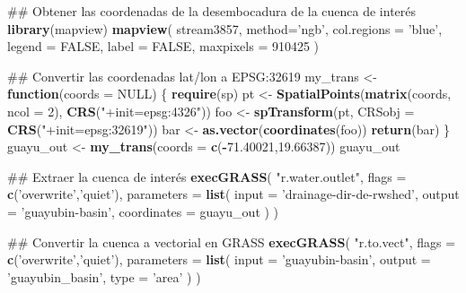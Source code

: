 \documentclass[11pt,]{article}
\newenvironment{Shaded}{\begin{snugshade}}{\end{snugshade}}
\newcommand{\KeywordTok}[1]{\textcolor[rgb]{0.13,0.29,0.53}{\textbf{#1}}}
\newcommand{\DataTypeTok}[1]{\textcolor[rgb]{0.13,0.29,0.53}{#1}}
\newcommand{\DecValTok}[1]{\textcolor[rgb]{0.00,0.00,0.81}{#1}}
\newcommand{\FloatTok}[1]{\textcolor[rgb]{0.00,0.00,0.81}{#1}}
\newcommand{\StringTok}[1]{\textcolor[rgb]{0.31,0.60,0.02}{#1}}
\newcommand{\OtherTok}[1]{\textcolor[rgb]{0.56,0.35,0.01}{#1}}
\newcommand{\ControlFlowTok}[1]{\textcolor[rgb]{0.13,0.29,0.53}{\textbf{#1}}}
\newcommand{\OperatorTok}[1]{\textcolor[rgb]{0.81,0.36,0.00}{\textbf{#1}}}
\newcommand{\NormalTok}[1]{#1}
\begin{document}
\begin{Shaded}
\begin{Highlighting}[]
{{{{{{\NormalTok{## Obtener las coordenadas de la desembocadura de la cuenca de interés}
\KeywordTok{library}\NormalTok{(mapview)}
\KeywordTok{mapview}\NormalTok{(}
\NormalTok{  stream3857, }\DataTypeTok{method=}\StringTok{'ngb'}\NormalTok{, }\DataTypeTok{col.regions =} \StringTok{'blue'}\NormalTok{,}
  \DataTypeTok{legend =} \OtherTok{FALSE}\NormalTok{, }\DataTypeTok{label =} \OtherTok{FALSE}\NormalTok{, }\DataTypeTok{maxpixels =}  \DecValTok{910425}
\NormalTok{)}

\NormalTok{## Convertir las coordenadas lat/lon a EPSG:32619}
\NormalTok{my_trans <-}\StringTok{ }\ControlFlowTok{function}\NormalTok{(}\DataTypeTok{coords =} \OtherTok{NULL}\NormalTok{) \{}
  \KeywordTok{require}\NormalTok{(sp)}
\NormalTok{  pt <-}\StringTok{ }\KeywordTok{SpatialPoints}\NormalTok{(}\KeywordTok{matrix}\NormalTok{(coords, }\DataTypeTok{ncol =} \DecValTok{2}\NormalTok{), }\KeywordTok{CRS}\NormalTok{(}\StringTok{"+init=epsg:4326"}\NormalTok{))}
\NormalTok{  foo <-}\StringTok{ }\KeywordTok{spTransform}\NormalTok{(pt, }\DataTypeTok{CRSobj =} \KeywordTok{CRS}\NormalTok{(}\StringTok{"+init=epsg:32619"}\NormalTok{))}
\NormalTok{  bar <-}\StringTok{ }\KeywordTok{as.vector}\NormalTok{(}\KeywordTok{coordinates}\NormalTok{(foo))}
  \KeywordTok{return}\NormalTok{(bar)}
\NormalTok{\}}
\NormalTok{guayu_out <-}\StringTok{ }\KeywordTok{my_trans}\NormalTok{(}\DataTypeTok{coords =} \KeywordTok{c}\NormalTok{(}\OperatorTok{-}\FloatTok{71.40021}\NormalTok{,}\FloatTok{19.66387}\NormalTok{))}
\NormalTok{guayu_out}

\NormalTok{## Extraer la cuenca de interés}
\KeywordTok{execGRASS}\NormalTok{(}
  \StringTok{"r.water.outlet"}\NormalTok{,}
  \DataTypeTok{flags =} \KeywordTok{c}\NormalTok{(}\StringTok{'overwrite'}\NormalTok{,}\StringTok{'quiet'}\NormalTok{),}
  \DataTypeTok{parameters =} \KeywordTok{list}\NormalTok{(}
    \DataTypeTok{input =} \StringTok{'drainage-dir-de-rwshed'}\NormalTok{,}
    \DataTypeTok{output =} \StringTok{'guayubin-basin'}\NormalTok{,}
    \DataTypeTok{coordinates =}\NormalTok{ guayu_out}
\NormalTok{  )}
\NormalTok{)}

\NormalTok{## Convertir la cuenca a vectorial en GRASS}
\KeywordTok{execGRASS}\NormalTok{(}
  \StringTok{"r.to.vect"}\NormalTok{,}
  \DataTypeTok{flags =} \KeywordTok{c}\NormalTok{(}\StringTok{'overwrite'}\NormalTok{,}\StringTok{'quiet'}\NormalTok{),}
  \DataTypeTok{parameters =} \KeywordTok{list}\NormalTok{(}
    \DataTypeTok{input =} \StringTok{'guayubin-basin'}\NormalTok{,}
    \DataTypeTok{output =} \StringTok{'guayubin_basin'}\NormalTok{,}
    \DataTypeTok{type =} \StringTok{'area'}
\NormalTok{  )}
\NormalTok{)}

}}}}}}
\end{Highlighting}
\end{Shaded}
\end{document}
